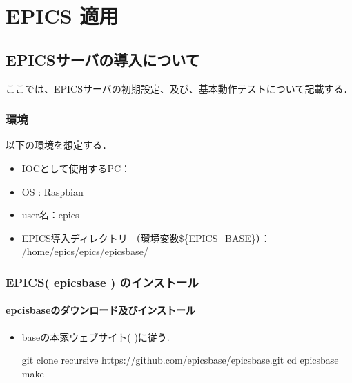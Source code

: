 \documentclass[letterpaper,10pt,dvipdfmx]{sphinxmanual}
\begin{document}
\chapter{EPICS 適用}
\label{\detokenize{epics/rst/epics_index:id3}}

\section{EPICSサーバの導入について}
\label{\detokenize{epics/rst/basic_startup:epics}}\label{\detokenize{epics/rst/basic_startup::doc}}
ここでは、EPICSサーバの初期設定、及び、基本動作テストについて記載する．


\subsection{環境}
\label{\detokenize{epics/rst/basic_startup:id1}}
以下の環境を想定する．
\begin{itemize}
\item {} 
IOCとして使用するPC： 

\item {} 
OS : Raspbian

\item {} 
user名：epics

\item {} 
EPICS導入ディレクトリ （環境変数\$\{EPICS\_BASE\}）： /home/epics/epics/epics\sphinxhyphen{}base/

\end{itemize}


\subsection{EPICS( epics\sphinxhyphen{}base ) のインストール}
\label{\detokenize{epics/rst/basic_startup:epics-epics-base}}

\subsubsection{epcis\sphinxhyphen{}baseのダウンロード及びインストール}
\label{\detokenize{epics/rst/basic_startup:epcis-base}}\begin{itemize}
\item {} 
baseの本家ウェブサイト(  )に従う.

\begin{sphinxVerbatim}[commandchars=\\\{\}]
\PYGZdl{} git clone \PYGZhy{}\PYGZhy{}recursive https://github.com/epics\PYGZhy{}base/epics\PYGZhy{}base.git
\PYGZdl{} cd epics\PYGZhy{}base
\PYGZdl{} make
\end{sphinxVerbatim}

\end{itemize}
\end{document}
